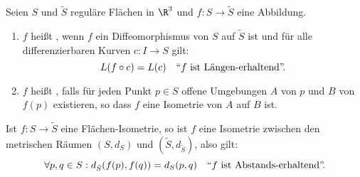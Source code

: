 \begin{definition}
  Seien \( S \) und \( \tilde{S} \) reguläre Flächen in \( \R^3 \) und \( f: S \to \tilde{S} \) eine Abbildung.
  \begin{enumerate}

    \item \( f \) heißt , wenn \( f \) ein Diffeomorphismus von \( S \) auf \( \tilde{S} \) ist und für alle differenzierbaren Kurven \( c: I \to S \) gilt:
    \begin{equation*}
      L(f \circ c) = L(c) \quad \text{``\( f \) ist Längen-erhaltend''.}
    \end{equation*}

    \item \( f \) heißt , falls für jeden Punkt \( p \in S \) offene Umgebungen \( A \) von \( p \) und \( B \) von \( f(p) \) existieren, so dass \( f \) eine Isometrie von \( A \) auf \( B \) ist.
  \end{enumerate}
\end{definition}

\begin{remark}[Abstandserhaltend]
  Ist \( f: S \to \tilde{S} \) eine Flächen-Isometrie, so ist \( f \) eine Isometrie zwischen den metrischen Räumen \( (S, d_S) \) und \( (\tilde{S}, d_{\tilde{S}}) \), also gilt:
  \begin{equation*}
    \forall p,q \in S : d_{\tilde{S}}(f(p),f(q)) = d_S(p,q) \quad \text{``\( f \) ist Abstands-erhaltend''.}
  \end{equation*}
\end{remark}

